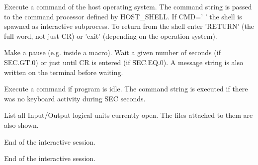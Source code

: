 \ENDCMD


\BEGARG
{}
\ENDARG

   \par
Execute a command of the host operating system.  The command string is 
   passed to the command processor defined by HOST_SHELL.  If CMD=' ' the 
   shell is spawned as interactive subprocess.  To return from the shell enter 
   'RETURN' (the full word, not just \BRA{}CR\KET{}) or 'exit' (depending on 
   the operation system).  

\ENDCMD


\BEGARG
{}
\ENDARG

   \par
Make a pause (e.g. inside a macro).  Wait a given number of seconds (if 
   SEC.GT.0) or just until \BRA{}CR\KET{} is entered (if SEC.EQ.0).  A message 
   string is also written on the terminal before waiting.  

\ENDCMD


\BEGARG
{}
\ENDARG

   \par
Execute a command if program is idle.  The command string is executed if 
   there was no keyboard activity during SEC seconds.  

\ENDCMD


   \par
List all Input/Output logical units currently open.  The files attached to 
   them are also shown.  

\ENDCMD


   \par
End of the interactive session.  

\ENDCMD


   \par
End of the interactive session.  

\ENDCMD

